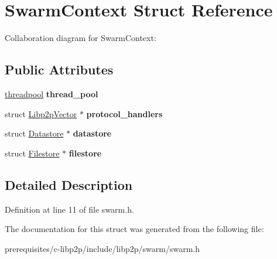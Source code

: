 \hypertarget{struct_swarm_context}{}\section{Swarm\+Context Struct Reference}
\label{struct_swarm_context}


Collaboration diagram for Swarm\+Context\+:
\subsection*{Public Attributes}
\begin{DoxyCompactItemize}
\item 
\mbox{\label{struct_swarm_context_a27bfaafdbbdfd95188037174a0ceba7a}} 
\mbox{\hyperlink{structthpool__}{threadpool}} {\bfseries thread\+\_\+pool}
\item 
\mbox{\label{struct_swarm_context_ac0c01dff5261b92a7fac7b75f7ad19a4}} 
struct \mbox{\hyperlink{struct_libp2p_vector}{Libp2p\+Vector}} $\ast$ {\bfseries protocol\+\_\+handlers}
\item 
\mbox{\label{struct_swarm_context_a40a74a1ae0cd1df970095b01207c5ebb}} 
struct \mbox{\hyperlink{struct_datastore}{Datastore}} $\ast$ {\bfseries datastore}
\item 
\mbox{\label{struct_swarm_context_ad772361df7e02700aec06ccc28e051b1}} 
struct \mbox{\hyperlink{struct_filestore}{Filestore}} $\ast$ {\bfseries filestore}
\end{DoxyCompactItemize}


\subsection{Detailed Description}


Definition at line 11 of file swarm.\+h.



The documentation for this struct was generated from the following file\+:\begin{DoxyCompactItemize}
\item 
prerequisites/c-\/libp2p/include/libp2p/swarm/swarm.\+h\end{DoxyCompactItemize}
